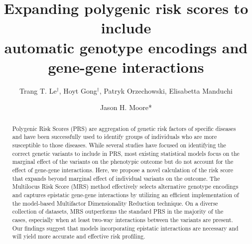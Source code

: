 \documentclass{ws-procs11x85}
\begin{document}
\title{Expanding polygenic risk scores to include\\
automatic genotype encodings and gene-gene interactions}

\author{Trang T. Le$^\dag$, Hoyt Gong$^\dag$, Patryk Orzechowski, Elisabetta Manduchi}

\address{Department of Biostatistics, Epidemiology and Informatics,\\
University of Pennsylvania, Philadelphia, PA 19104}

\author{Jason H. Moore*}

\address{Department of Biostatistics, Epidemiology and Informatics,\\
Institute for Biomedical Informatics\\
University of Pennsylvania, Philadelphia, PA 19104\\
Email: jhmoore@upenn.edu}

\begin{abstract}
Polygenic Risk Scores (PRS) are aggregation of genetic risk factors of
specific diseases and have been successfully used to identify groups
of individuals who are more susceptible to those diseases. While several
studies have focused on identifying the correct genetic variants to
include in PRS, most existing statistical models focus on the marginal
effect of the variants on the phenotypic outcome but do not account for
the effect of gene-gene interactions. Here, we propose a novel
calculation of the risk score that expands beyond marginal effect of
individual variants on the outcome. The Multilocus Risk Score
(MRS) method effectively selects alternative genotype encodings and
captures epistatic gene-gene interactions by utilizing an efficient
implementation of the model-based Multifactor Dimensionality Reduction
technique. On a diverse collection of datasets, MRS outperforms the
standard PRS in the majority of the cases, especially when at least
two-way interactions between the variants are present. Our findings suggest
that models incorporating epistatic interactions are
necessary and will yield more accurate and effective risk profiling.
\end{abstract}


\end{document}
